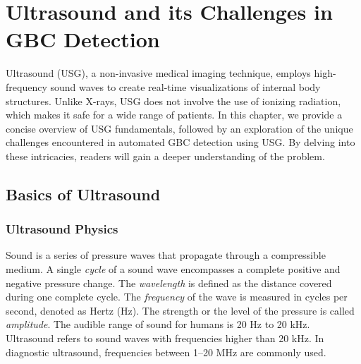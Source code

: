\chapter{Ultrasound and its Challenges in GBC Detection}
\label{chap:usg}
%
Ultrasound (USG), a non-invasive medical imaging technique, employs high-frequency sound waves to create real-time visualizations of internal body structures. 
Unlike X-rays, USG does not involve the use of ionizing radiation, which makes it safe for a wide range of patients. In this chapter, we provide a concise overview of USG fundamentals, followed by an exploration of the unique challenges encountered in automated GBC detection using USG. By delving into these intricacies, readers will gain a deeper understanding of the problem.

\section{Basics of Ultrasound}
%
\subsection{Ultrasound Physics}
Sound is a series of pressure waves that propagate through a compressible medium. A single \emph{cycle} of a sound wave encompasses a complete positive and negative pressure change. The \emph{wavelength} is defined as the distance covered during one complete cycle. The \emph{frequency} of the wave is measured in cycles per second, denoted as Hertz (Hz). The strength or the level of the pressure is called \emph{amplitude}. The audible range of sound for humans is 20 Hz to 20 kHz. Ultrasound refers to sound waves with frequencies higher than 20 kHz. In diagnostic ultrasound, frequencies between 1--20 MHz are commonly used.

